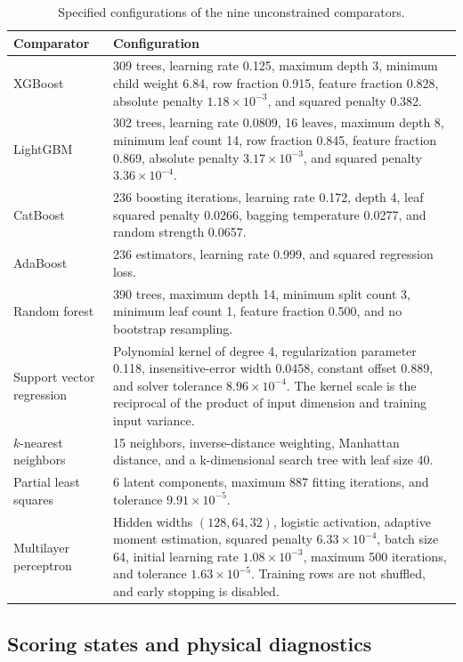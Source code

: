 \begin{table}[htbp]
\centering\small
\caption{Specified configurations of the nine unconstrained comparators.}\label{tab:icsor_comparator_settings}
\begin{tabular}{p{}p{}}
\toprule
Comparator & Configuration\\
\midrule
XGBoost & 309 trees, learning rate 0.125, maximum depth 3, minimum child weight 6.84, row fraction 0.915, feature fraction 0.828, absolute penalty \(1.18\times10^{-3}\), and squared penalty 0.382.\\
LightGBM & 302 trees, learning rate 0.0809, 16 leaves, maximum depth 8, minimum leaf count 14, row fraction 0.845, feature fraction 0.869, absolute penalty \(3.17\times10^{-3}\), and squared penalty \(3.36\times10^{-4}\).\\
CatBoost & 236 boosting iterations, learning rate 0.172, depth 4, leaf squared penalty 0.0266, bagging temperature 0.0277, and random strength 0.0657.\\
AdaBoost & 236 estimators, learning rate 0.999, and squared regression loss.\\
Random forest & 390 trees, maximum depth 14, minimum split count 3, minimum leaf count 1, feature fraction 0.500, and no bootstrap resampling.\\
Support vector regression & Polynomial kernel of degree 4, regularization parameter 0.118, insensitive-error width 0.0458, constant offset 0.889, and solver tolerance \(8.96\times10^{-4}\). The kernel scale is the reciprocal of the product of input dimension and training input variance.\\
\(k\)-nearest neighbors & 15 neighbors, inverse-distance weighting, Manhattan distance, and a k-dimensional search tree with leaf size 40.\\
Partial least squares & 6 latent components, maximum 887 fitting iterations, and tolerance \(9.91\times10^{-5}\).\\
Multilayer perceptron & Hidden widths \((128,64,32)\), logistic activation, adaptive moment estimation, squared penalty \(6.33\times10^{-4}\), batch size 64, initial learning rate \(1.08\times10^{-3}\), maximum 500 iterations, and tolerance \(1.63\times10^{-5}\). Training rows are not shuffled, and early stopping is disabled.\\
\bottomrule
\end{tabular}
\end{table}

\subsection{Scoring states and physical diagnostics}


